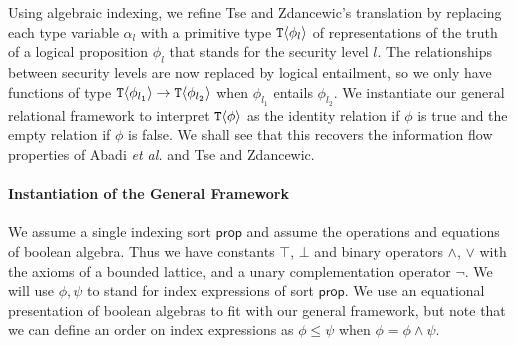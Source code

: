 Using algebraic indexing, we refine Tse and Zdancewic's translation by
replacing each type variable $\alpha_l$ with a primitive type
$\textup{\texttt{T}}\langle \phi_l \rangle$ of representations of the truth of a logical
proposition $\phi_l$ that stands for the security level $l$. The
relationships between security levels are now replaced by logical
entailment, so we only have functions of type $\textup{\texttt{T}}\langle \phi_{l_1} \rangle \to
\textup{\texttt{T}}\langle \phi_{l_2} \rangle$ when $\phi_{l_1}$ entails
$\phi_{l_2}$. %
We instantiate our general relational framework to interpret
$\textup{\texttt{T}}\langle \phi \rangle$ as the identity relation if $\phi$ is true and the
empty relation if $\phi$ is false. We shall see that this recovers the
information flow properties of Abadi {\em et al.} and Tse and
Zdancewic.

\paragraph{Instantiation of the General Framework}
We assume a single indexing sort $\mathsf{prop}$ and assume the
operations and equations of boolean algebra. Thus we have constants
$\top$, $\bot$ and binary operators $\land$, $\lor$ with the axioms of
a bounded lattice, and a unary complementation operator $\lnot$. We
will use $\phi, \psi$ to stand for index expressions of sort
$\mathsf{prop}$. We use an equational presentation of boolean algebras
to fit with our general framework, but note that we can define an
order on index expressions as $\phi \leq \psi$ when $\phi = \phi \land
\psi$.

